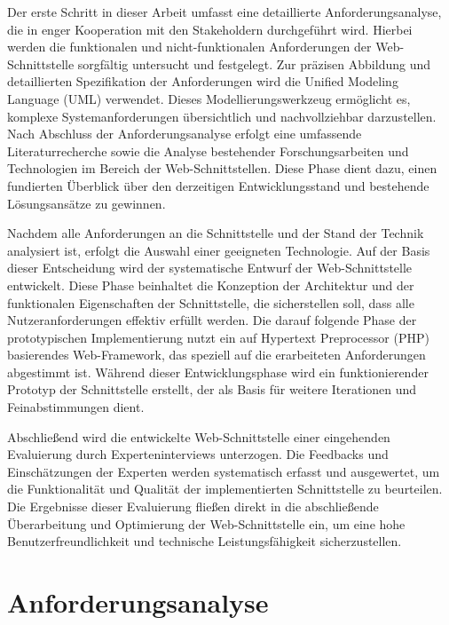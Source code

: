 \documentclass[draft,final]{vutinfth} %
\begin{document}
Der erste Schritt in dieser Arbeit umfasst eine detaillierte Anforderungsanalyse, die in enger Kooperation mit den Stakeholdern durchgeführt wird. 
Hierbei werden die funktionalen und nicht-funktionalen Anforderungen der Web-Schnittstelle sorgfältig untersucht und festgelegt. 
Zur präzisen Abbildung und detaillierten Spezifikation der Anforderungen wird die Unified Modeling Language (UML) verwendet. 
Dieses Modellierungswerkzeug ermöglicht es, komplexe Systemanforderungen übersichtlich und nachvollziehbar darzustellen.
Nach Abschluss der Anforderungsanalyse erfolgt eine umfassende Literaturrecherche sowie die Analyse bestehender Forschungsarbeiten und Technologien im Bereich der Web-Schnittstellen.
Diese Phase dient dazu, einen fundierten Überblick über den derzeitigen Entwicklungsstand und bestehende Lösungsansätze zu gewinnen.

Nachdem alle Anforderungen an die Schnittstelle und der Stand der Technik analysiert ist, erfolgt die Auswahl einer geeigneten Technologie. 
Auf der Basis dieser Entscheidung wird der systematische Entwurf der Web-Schnittstelle entwickelt. 
Diese Phase beinhaltet die Konzeption der Architektur und der funktionalen Eigenschaften der Schnittstelle, die sicherstellen soll, dass alle Nutzeranforderungen effektiv erfüllt werden.
Die darauf folgende Phase der prototypischen Implementierung nutzt ein auf Hypertext Preprocessor (PHP) basierendes Web-Framework, das speziell auf die erarbeiteten Anforderungen abgestimmt ist. 
Während dieser Entwicklungsphase wird ein funktionierender Prototyp der Schnittstelle erstellt, der als Basis für weitere Iterationen und Feinabstimmungen dient.

Abschließend wird die entwickelte Web-Schnittstelle einer eingehenden Evaluierung durch Experteninterviews unterzogen. 
Die Feedbacks und Einschätzungen der Experten werden systematisch erfasst und ausgewertet, um die Funktionalität und Qualität der implementierten Schnittstelle zu beurteilen. 
Die Ergebnisse dieser Evaluierung fließen direkt in die abschließende Überarbeitung und Optimierung der Web-Schnittstelle ein, um eine hohe Benutzerfreundlichkeit und technische Leistungsfähigkeit sicherzustellen.










\chapter{Anforderungsanalyse}
\end{document}
